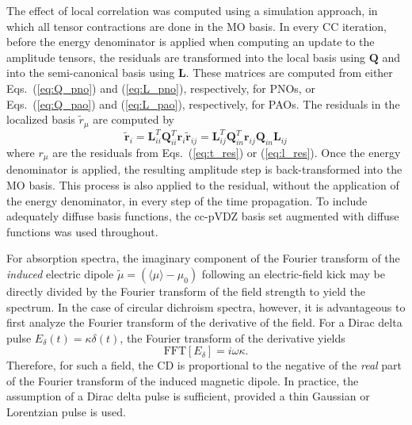 The effect of local correlation was computed using a simulation approach\cite{Hampel1996},
in which all tensor contractions are done in the MO basis. In every 
CC iteration, before the 
energy denominator is applied when computing an update to the amplitude tensors, the residuals
are transformed into the local basis using $\textbf{Q}$ and into the semi-canonical
basis using $\textbf{L}$. These matrices are computed from either Eqs.~(\ref{eq:Q_pno}) 
and (\ref{eq:L_pno}), respectively, for PNOs, or Eqs.~(\ref{eq:Q_pao}) and (\ref{eq:L_pao}),
respectively, for PAOs. The residuals in the localized basis $\tilde{r}_\mu$ are 
computed by
\begin{subequations} \label{eq:rotate}
\begin{equation} \label{eq:rotate_r1}
    \tilde{\textbf{r}}_i = \textbf{L}_{ii}^T\textbf{Q}_{ii}^T\textbf{r}_i
\end{equation}
\begin{equation} \label{eq:rotate_r2}
    \tilde{\textbf{r}}_{ij} = \textbf{L}_{ij}^T\textbf{Q}_{in}^T\textbf{r}_{ij}\textbf{Q}_{in}\textbf{L}_{ij}
\end{equation}
\end{subequations}
where $r_\mu$ are the residuals from Eqs.~(\ref{eq:t_res}) or (\ref{eq:l_res}). 
Once the energy denominator is applied, the resulting amplitude step is back-transformed
into the MO basis. This process is also applied to the residual, without the
application of the energy denominator, in every step of the time propagation.
To include 
adequately diffuse basis functions, the cc-pVDZ basis
set augmented with diffuse functions\cite{Dunning1989,Woon1994} was used throughout.  

For absorption spectra, 
the imaginary component of the Fourier transform of the \textit{induced} electric dipole 
$\tilde{\mu} = (\langle\mu\rangle - \mu_0)$ following an electric-field kick 
may be directly divided by the Fourier transform of the field strength to yield the spectrum. 
In the case of circular dichroism spectra, however, it is advantageous to first 
analyze the Fourier transform of the derivative of the field. 
For a Dirac delta pulse $E_\delta(t) = \kappa\delta(t)$, 
the Fourier transform of the derivative yields
\begin{equation}
    \textrm{FFT}[E_\delta] = i\omega\kappa.
\end{equation}
Therefore, for such a field, the CD is proportional to the negative of the 
\textit{real} part of the Fourier 
transform of the induced magnetic dipole. 
In practice, the assumption of a Dirac delta pulse is sufficient, provided
a thin Gaussian or Lorentzian pulse is used. 

